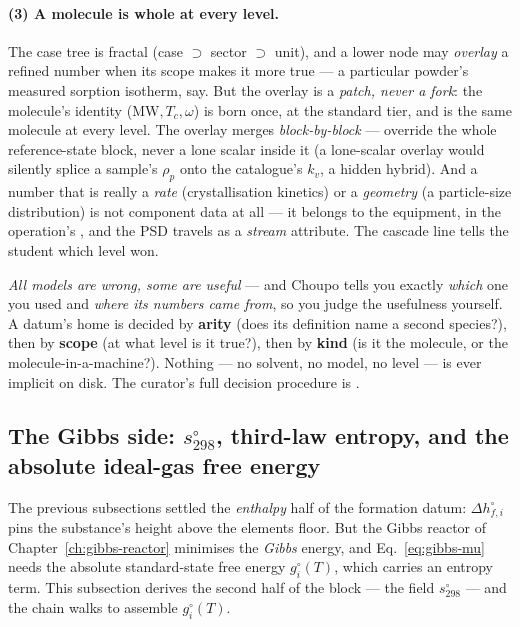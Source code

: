 \documentclass[11pt,a4paper]{article}
\begin{document}
\paragraph{(3) A molecule is whole at every level.}
The case tree is fractal (case $\supset$ sector $\supset$ unit), and a
lower node may \emph{overlay} a refined number when its scope makes it
more true --- a particular powder's measured sorption isotherm, say.  But
the overlay is a \emph{patch, never a fork}: the molecule's identity
($\mathrm{MW}, T_c, \omega$) is born once, at the standard tier, and is
the same molecule at every level.  The overlay merges
\emph{block-by-block} --- override the whole 
reference-state block, never a lone scalar inside it (a lone-scalar
overlay would silently splice a sample's $\rho_p$ onto the catalogue's
$k_v$, a hidden hybrid).  And a number that is really a \emph{rate}
(crystallisation kinetics) or a \emph{geometry} (a particle-size
distribution) is not component data at all --- it belongs to the
equipment, in the operation's , and the PSD travels as a
\emph{stream} attribute.  The cascade line tells the student which level
won.

\begin{intuition}
\emph{All models are wrong, some are useful} --- and Choupo tells you
exactly \emph{which} one you used and \emph{where its numbers came from},
so you judge the usefulness yourself.  A datum's home is decided by
\textbf{arity} (does its definition name a second species?), then by
\textbf{scope} (at what level is it true?), then by \textbf{kind} (is it
the molecule, or the molecule-in-a-machine?).  Nothing --- no solvent, no
model, no level --- is ever implicit on disk.  The curator's full
decision procedure is .
\end{intuition}

\subsection{The Gibbs side: \texorpdfstring{$s^{\circ}_{298}$}{s298}, third-law
entropy, and the absolute ideal-gas free energy}
\label{sec:gibbs-formation-entropy}

The previous subsections settled the \emph{enthalpy} half of the
formation datum: $\Delta h^{\circ}_{f,i}$ pins the substance's height
above the elements floor.  But the Gibbs reactor of
Chapter~\ref{ch:gibbs-reactor} minimises the \emph{Gibbs} energy, and
Eq.~\eqref{eq:gibbs-mu} needs the absolute standard-state free energy
$g^{\circ}_i(T)$, which carries an entropy term.  This subsection
derives the second half of the  block --- the
field $s^{\circ}_{298}$ --- and the chain
 walks to assemble $g^{\circ}_i(T)$.
\end{document}
